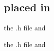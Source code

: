 \hypertarget{a00076}{}\subsection{placed in}
\label{a00076}


the .h file and  


the .h file and 

